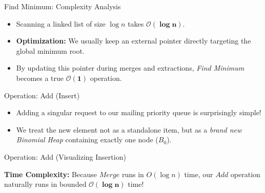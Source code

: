 \documentclass[11pt, aspectratio=169]{beamer}
\begin{document}
\begin{frame}{Find Minimum: Complexity Analysis}
    \begin{itemize}
        \item Scanning a linked list of size $\log n$ takes $\mathbf{\mathcal{O}(\log n)}$.
        \item \textbf{Optimization:} We usually keep an external pointer directly targeting the global minimum root.
        \item By updating this pointer during merges and extractions, \textit{Find Minimum} becomes a true $\mathbf{\mathcal{O}(1)}$ operation.
    \end{itemize}
\end{frame}

\begin{frame}{Operation: Add (Insert)}
    \begin{itemize}
        \item Adding a singular request to our mailing priority queue is surprisingly simple!
        \item We treat the new element not as a standalone item, but as a \textit{brand new Binomial Heap} containing exactly one node ($B_0$).
    \end{itemize}
\end{frame}

\begin{frame}{Operation: Add (Visualizing Insertion)}
    \begin{center}
    \end{center}
    \vspace{0.3cm}
    \textbf{Time Complexity:} Because $Merge$ runs in $O(\log n)$ time, our $Add$ operation naturally runs in bounded $\mathbf{\mathcal{O}(\log n)}$ time!
\end{frame}
\end{document}
